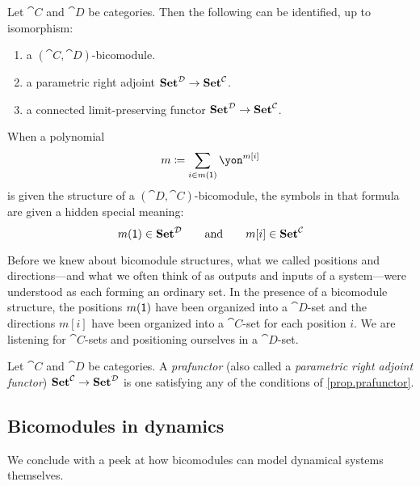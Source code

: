 \documentclass[Book-Poly]{subfiles}
\begin{document}
\begin{proposition}[Garner]\label{prop.prafunctor}
Let $\cat{C}$ and $\cat{D}$ be categories.
Then the following can be identified, up to isomorphism:
\begin{enumerate}
	\item a $(\cat{C},\cat{D})$-bicomodule.
	\item a parametric right adjoint $\mathbf{Set}^{\mathcal{D}}\to\mathbf{Set}^{\mathcal{C}}$.
	\item a connected limit-preserving functor $\mathbf{Set}^{\mathcal{D}}\to\mathbf{Set}^{\mathcal{C}}$.
\end{enumerate}
\end{proposition}


When a polynomial
\[
m\coloneqq\sum_{i\in m(\1)}\yon^{m[i]}
\]
is given the structure of a $(\cat{D},\cat{C})$-bicomodule, the symbols in that formula are given a hidden special meaning:
\[
  m(\textsf{1})\in\mathbf{Set}^{\mathcal{D}}
  \qquad\text{and}\qquad
	m[i]\in\mathbf{Set}^{\mathcal{C}}
\]

Before we knew about bicomodule structures, what we called positions and directions---and what we often think of as outputs and inputs of a system---were understood as each forming an ordinary set. In the presence of a bicomodule structure, the positions $m(\textsf{1})$ have been organized into a $\cat{D}$-set and the directions $m[i]$ have been organized into a $\cat{C}$-set for each position $i$. We are listening for $\cat{C}$-sets and positioning ourselves in a $\cat{D}$-set.


\begin{definition}[Prafunctor]
Let $\cat{C}$ and $\cat{D}$ be categories. A \emph{prafunctor} (also called a \emph{parametric right adjoint functor}) $\mathbf{Set}^{\mathcal{C}}\to\mathbf{Set}^{\mathcal{D}}$ is one satisfying any of the conditions of \cref{prop.prafunctor}.
\end{definition}

\subsection{Bicomodules in dynamics}

We conclude with a peek at how bicomodules can model dynamical systems themselves.
\end{document}
